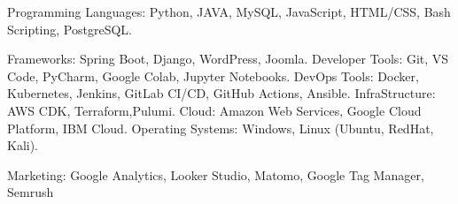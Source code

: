 

\begin{cvskills}

  \cvskill
    {Programming Languages:} %
    {Python, JAVA, MySQL, JavaScript, HTML/CSS, Bash Scripting, PostgreSQL.} %

  \cvskill
    {Frameworks:} %
    {Spring Boot, Django, WordPress, Joomla.} %
  \cvskill
    {Developer Tools:} %
    {Git, VS Code, PyCharm, Google Colab, Jupyter Notebooks.} %
  \cvskill
    {DevOps Tools:} %
    {Docker, Kubernetes, Jenkins, GitLab CI/CD, GitHub Actions, Ansible.} %
  \cvskill
    {InfraStructure:} %
    {AWS CDK, Terraform,Pulumi.} %
  \cvskill
    {Cloud:} %
    {Amazon Web Services, Google Cloud Platform, IBM Cloud.} %
  \cvskill
    {Operating Systems:} %
    {Windows, Linux (Ubuntu, RedHat, Kali).} %


  \cvskill
    {Marketing:} %
    {Google Analytics, Looker Studio, Matomo, Google Tag Manager, Semrush} %

\end{cvskills}
